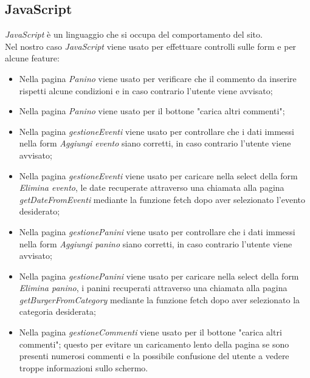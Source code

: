 \subsection{JavaScript}
\emph{JavaScript} è un linguaggio che si occupa del comportamento del sito.\\
Nel nostro caso \emph{JavaScript} viene usato per effettuare controlli sulle form e per alcune feature:
\begin{itemize}
    \item Nella pagina \emph{Panino} viene usato per verificare che il commento da inserire rispetti alcune condizioni e in caso contrario l'utente viene avvisato;
    \item Nella pagina \emph{Panino} viene usato per il bottone "carica altri commenti";
    \item Nella pagina \emph{gestioneEventi} viene usato per controllare che i dati immessi nella form \emph{Aggiungi evento} siano corretti, in caso contrario l'utente viene avvisato;
    \item Nella pagina \emph{gestioneEventi} viene usato per caricare nella select della form \emph{Elimina evento}, le date recuperate attraverso una chiamata alla pagina \emph{getDateFromEventi} mediante la funzione fetch dopo aver selezionato l'evento desiderato;
    \item Nella pagina \emph{gestionePanini} viene usato per controllare che i dati immessi nella form \emph{Aggiungi panino} siano corretti, in caso contrario l'utente viene avvisato;
    \item Nella pagina \emph{gestionePanini} viene usato per caricare nella select della form \emph{Elimina panino}, i panini recuperati attraverso una chiamata alla pagina \emph{getBurgerFromCategory} mediante la funzione fetch dopo aver selezionato la categoria desiderata;
    \item Nella pagina \emph{gestioneCommenti} viene usato per il bottone "carica altri commenti"; questo per evitare un caricamento lento della pagina se sono presenti numerosi commenti e la possibile confusione del utente a vedere troppe informazioni sullo schermo.
\end{itemize}